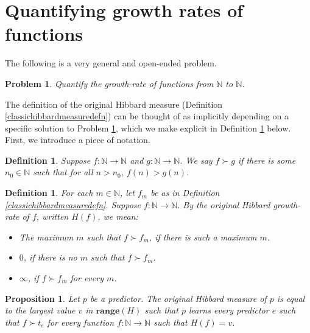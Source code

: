 \documentclass{article}
\newtheorem{definition}[theorem]{Definition}
\newtheorem{problem}[theorem]{Problem}
\newtheorem{proposition}[theorem]{Proposition}
\begin{document}
\section{Quantifying growth rates of functions}
\label{growthratesection}

The following is a very general and open-ended problem.

\begin{problem}
\label{bigoproblem}
    Quantify the growth-rate of functions from $\mathbb N$ to $\mathbb N$.
\end{problem}

The definition of the original Hibbard measure (Definition \ref{classichibbardmeasuredefn})
can be thought of as implicitly depending on a specific solution to Problem
\ref{bigoproblem}, which we make explicit in Definition \ref{hibbardgrowthratedefn} below.
First, we introduce a piece of notation.

\begin{definition}
\label{functionsuccdefn}
    Suppose $f:\mathbb N\to\mathbb N$ and $g:\mathbb N\to\mathbb N$.
    We say $f\succ g$ if there is some $n_0\in \mathbb N$ such that for all
    $n>n_0$, $f(n)>g(n)$.
\end{definition}

\begin{definition}
\label{hibbardgrowthratedefn}
    For each $m\in\mathbb N$, let $f_m$ be as in Definition \ref{classichibbardmeasuredefn}.
    Suppose $f:\mathbb N\to\mathbb N$. By the \emph{original Hibbard growth-rate
    of $f$}, written $H(f)$, we mean:
    \begin{itemize}
        \item
        The maximum $m$ such that $f\succ f_m$, if there is such a maximum $m$.
        \item
        $0$, if there is no $m$ such that $f\succ f_m$.
        \item
        $\infty$, if $f\succ f_m$ for every $m$.
    \end{itemize}
\end{definition}

\begin{proposition}
    Let $p$ be a predictor. The original Hibbard measure of $p$
    is equal to the largest value $v$ in $\mathbf{range}(H)$
    such that $p$ learns every predictor $e$ such that
    $f\succ t_e$ for every function $f:\mathbb N\to\mathbb N$ such
    that $H(f)=v$.
\end{proposition}
\end{document}
